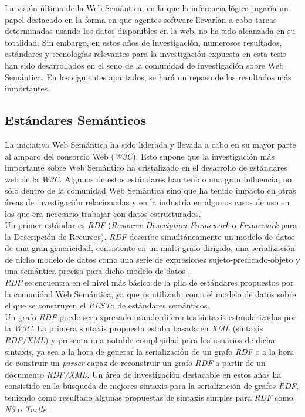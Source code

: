 La visi\'on \'ultima de la Web Sem\'antica, en la que la inferencia l\'ogica jugar\'ia un papel destacado en la forma en que agentes software llevar\'ian a cabo tareas determinadas usando los datos disponibles en la web, no ha sido alcanzada en su totalidad. Sin embargo, en estos a\~nos de investigaci\'on, numerosos resultados, est\'andares y tecnolog\'ias relevantes para la investigaci\'on expuesta en esta tesis han sido desarrollados en el seno de la comunidad de investigaci\'on sobre Web Sem\'antica. 
En los siguientes apartados, se har\'a un repaso de los resultados m\'as importantes.

\subsection{Est\'andares Sem\'anticos}

La iniciativa Web Sem\'antica ha sido liderada y llevada a cabo en su mayor parte al amparo del consorcio Web (\textit{W3C}). Esto supone que la investigaci\'on m\'as importante sobre Web Sem\'antico ha cristalizado en el desarrollo de est\'andares web de la \textit{W3C}. Algunos de estos est\'andares han tenido una gran influencia, no s\'olo dentro de la comunidad Web Sem\'antica sino que ha tenido impacto en otras \'areas de investigaci\'on relacionadas y en la industria en algunos casos de uso en los que era necesario trabajar con datos estructurados.\\

Un primer est\'andar es \textit{RDF} (\textit{Resource Description Framework} o \textit{Framework} para la Descripci\'on de Recursos). \textit{RDF} describe simult\'aneamente un modelo de datos de una gran genericidad, consistente en un multi grafo dirigido, una serializaci\'on de dicho modelo de datos como una serie de expresiones sujeto-predicado-objeto y una sem\'antica precisa para dicho modelo de datos \cite{hayes2004rdf}.\\

\textit{RDF} se encuentra en el nivel m\'as b\'asico de la pila de est\'andares propuestos por la comunidad Web Sem\'antica, ya que es utilizado como el modelo de datos sobre el que se construyen el \textit{REST}o de est\'andares sem\'anticos.\\

Un grafo \textit{RDF} puede ser expresado usando diferentes sintaxis estandarizadas por la \textit{W3C}. La primera sintaxis propuesta estaba basada en \textit{XML} (sintaxis \textit{RDF/XML}) \cite{beckett2004rdf} y presenta una notable complejidad para los usuarios de dicha sintaxis, ya sea a la hora de generar la serializaci\'on de un grafo \textit{RDF} o a la hora de construir un \textit{parser} capaz de reconstruir un grafo \textit{RDF} a partir de un documento \textit{RDF/XML}. Un \'area de investigaci\'on destacable en estos a\~nos ha consistido en la b\'usqueda de mejores sintaxis para la serializaci\'on de grafos \textit{RDF}, teniendo como resultado algunas propuestas de sintaxis simples para \textit{RDF} como \textit{N3} \cite{n3} o \textit{Turtle} \cite{turtle}.\\


